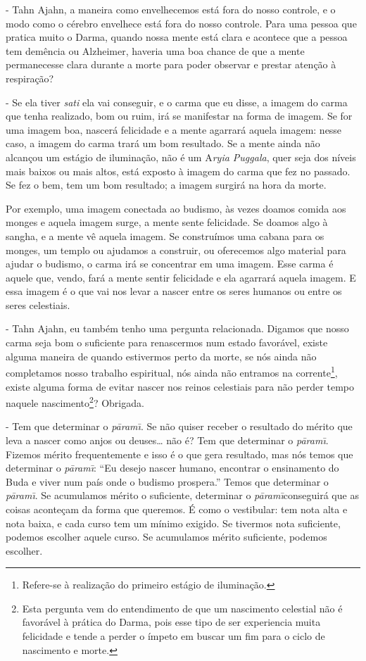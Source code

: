 - Tahn Ajahn, a maneira como envelhecemos está fora do nosso
controle, e o modo como o cérebro envelhece está fora do nosso
controle. Para uma pessoa que pratica muito o Darma, quando nossa mente
está clara e acontece que a pessoa tem demência ou Alzheimer, haveria
uma boa chance de que a mente permanecesse clara durante a morte para
poder observar e prestar atenção à respiração?

- Se ela tiver \textit{sati }ela vai conseguir, e o carma que eu
disse, a imagem do carma que tenha realizado, bom ou ruim, irá se
manifestar na forma de imagem. Se for uma imagem boa, nascerá
felicidade e a mente agarrará aquela imagem: nesse caso, a imagem do
carma trará um bom resultado. Se a mente ainda não alcançou um estágio
de iluminação, não é um A\textit{ryia Puggala}, quer seja dos níveis
mais baixos ou mais altos, está exposto à imagem do carma que fez no
passado. Se fez o bem, tem um bom resultado; a imagem surgirá na hora
da morte.

Por exemplo, uma imagem conectada ao budismo, às vezes doamos comida
aos monges e aquela imagem surge, a mente sente felicidade. Se doamos
algo à sangha, e a mente vê aquela imagem. Se construímos uma cabana
para os monges, um templo ou ajudamos a construir, ou oferecemos algo
material para ajudar o budismo, o carma irá se concentrar em uma
imagem. Esse carma é aquele que, vendo, fará a mente sentir felicidade
e ela agarrará aquela imagem. E essa imagem é o que vai nos levar a
nascer entre os seres humanos ou entre os seres celestiais.

- Tahn Ajahn, eu também tenho uma pergunta relacionada. Digamos
que nosso carma seja bom o suficiente para renascermos num estado
favorável, existe alguma maneira de quando estivermos perto da morte,
se nós ainda não completamos nosso trabalho espiritual, nós ainda não
entramos na corrente\footnote{Refere-se à realização do primeiro
estágio de iluminação.}, existe alguma forma de evitar nascer nos
reinos celestiais para não perder tempo naquele
nascimento\footnote{Esta pergunta vem do entendimento de que um
nascimento celestial não é favorável à prática do Darma, pois esse tipo
de ser experiencia muita felicidade e tende a perder o ímpeto em buscar
um fim para o ciclo de nascimento e morte.}? Obrigada.

- Tem que determinar o \textit{p\=aram\=\i}. Se não quiser receber
o resultado do mérito que leva a nascer como anjos ou deuses…
não é? Tem que determinar o \textit{p\=aram\=\i}. Fizemos mérito
frequentemente e isso é o que gera resultado, mas nós temos que
determinar o \textit{p\=aram\=\i}: “Eu desejo nascer humano, encontrar
o ensinamento do Buda e viver num país onde o budismo prospera.” Temos
que determinar o \textit{p\=aram\=\i}. Se acumulamos mérito o
suficiente, determinar o \textit{p\=aram\=\i }conseguirá que as coisas
aconteçam da forma que queremos. É como o vestibular: tem nota alta e
nota baixa, e cada curso tem um mínimo exigido. Se tivermos nota
suficiente, podemos escolher aquele curso. Se acumulamos mérito
suficiente, podemos escolher.

